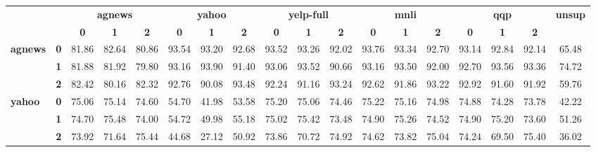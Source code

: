 \clearpage
\thispagestyle{empty}
\begin{sidewaystable*}[h]
	\centering
	\fontsize{8}{20}
	\selectfont
	\setlength\tabcolsep{1pt}
\begin{tabular*}{\columnwidth}{l@{\extracolsep{\fill}}lcccccccccccccccc}
	\toprule
                                    &            & \multicolumn{3}{c}{\textbf{agnews}}  & \multicolumn{3}{c}{\textbf{yahoo}}   & \multicolumn{3}{c}{\textbf{yelp-full}} & \multicolumn{3}{c}{\textbf{mnli}}    & \multicolumn{3}{c}{\textbf{qqp}}     & \multirow{2}{*}{\textbf{unsup}} \\
                                    &            & \textbf{0} & \textbf{1} & \textbf{2} & \textbf{0} & \textbf{1} & \textbf{2} & \textbf{0}  & \textbf{1}  & \textbf{2} & \textbf{0} & \textbf{1} & \textbf{2} & \textbf{0} & \textbf{1} & \textbf{2} &                                 \\
				    \hline
\multirow{3}{*}{\textbf{agnews}}    & \textbf{0} & 81.86      & 82.64      & 80.86      & 93.54      & 93.20      & 92.68      & 93.52       & 93.26       & 92.02      & 93.76      & 93.34      & 92.70      & 93.14      & 92.84      & 92.14      & 65.48                           \\
                                    & \textbf{1} & 81.88      & 81.92      & 79.80      & 93.16      & 93.90      & 91.40      & 93.06       & 93.52       & 90.66      & 93.16      & 93.50      & 92.00      & 92.70      & 93.56      & 93.36      & 74.72                           \\
                                    & \textbf{2} & 82.42      & 80.16      & 82.32      & 92.76      & 90.08      & 93.48      & 92.24       & 91.16       & 93.24      & 92.62      & 91.86      & 93.22      & 92.92      & 91.60      & 91.92      & 59.76                           \\
				    \hline
\multirow{3}{*}{\textbf{yahoo}}     & \textbf{0} & 75.06      & 75.14      & 74.60      & 54.70      & 41.98      & 53.58      & 75.20       & 75.06       & 74.46      & 75.22      & 75.16      & 74.98      & 74.88      & 74.28      & 73.78      & 42.22                           \\
                                    & \textbf{1} & 74.70      & 75.48      & 74.00      & 54.72      & 49.98      & 55.18      & 75.02       & 75.42       & 73.48      & 74.90      & 75.26      & 74.52      & 74.90      & 75.20      & 73.60      & 51.26                           \\
                                    & \textbf{2} & 73.92      & 71.64      & 75.44      & 44.68      & 27.12      & 50.92      & 73.86       & 70.72       & 74.92      & 74.62      & 73.82      & 75.04      & 74.24      & 69.50      & 75.40      & 36.02                           \\

\end{tabular*}
\end{sidewaystable*}
